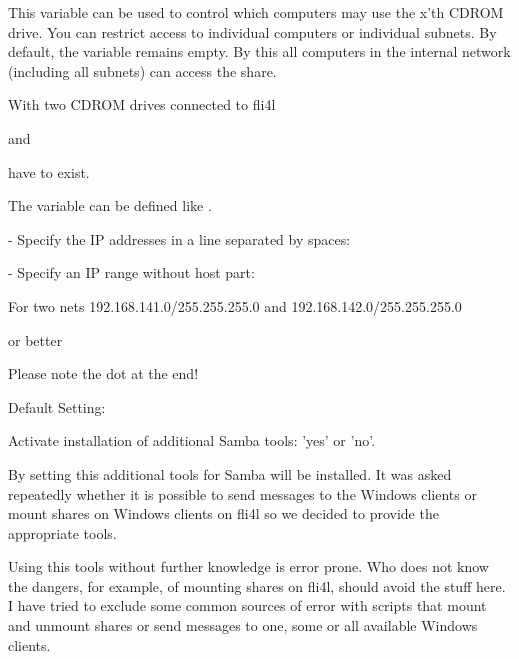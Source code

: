 \begin{description}

  This variable can be used to control which computers
  may use the x'th CDROM drive. You can restrict access to
  individual computers or individual subnets.
  By default, the variable remains empty. By this
  all computers in the internal network (including all subnets)
  can access the share.

  With two CDROM drives connected to fli4l


  and


  have to exist.

  The variable can be defined like .

  - Specify the IP addresses in a line separated by spaces:


  - Specify an IP range without host part:


  For two nets 192.168.141.0/255.255.255.0 and
  192.168.142.0/255.255.255.0

  or better


  Please note the dot at the end!

  Default Setting: 

\end{description}

  Activate installation of additional Samba tools: 'yes' or 'no'.

  By setting this additional tools for Samba will be installed.
  It was asked repeatedly whether it is possible to send messages to
  the Windows clients or mount shares on Windows clients on fli4l so
  we decided to provide the appropriate tools.

  Using this tools without further knowledge is error prone.
  Who does not know the dangers, for example, of mounting
  shares on fli4l, should avoid the stuff here. I have
  tried to exclude some common sources of error with scripts
  that mount and unmount shares or send messages to one, some
  or all available Windows clients.

